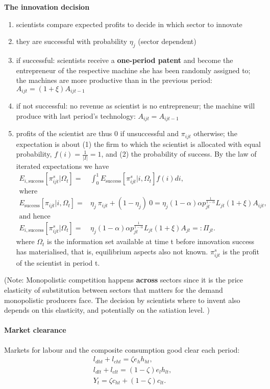  \textbf{The innovation decision}
 \begin{enumerate}
 	\item scientists compare expected profits to decide in which sector to innovate
 	\item they are successful with probability $\eta_j$ (sector dependent)
 	\item if successful: scientists receive a \textbf{one-period patent} and become the entrepreneur of the respective machine she has been randomly assigned to; the machines are more productive than in the previous period: $A_{ijt}=(1+\xi)A_{ijt-1}$
 	\item if not successful: no revenue as scientist is no entrepreneur; the machine will produce with last period's  technology: $A_{ijt}=A_{ijt-1}$
 	\item profits of the scientist are thus 0 if unsuccessful and $\pi_{ijt}$ otherwise; the expectation is about (1) the firm to which the scientist is allocated with equal probability, $f(i)=\frac{1}{|I|}=1$, and (2) the probability of success. By the law of iterated expectations we have
 	\begin{align*}
 	E_{i,\text{success}}[\pi^s_{ijt}| \Omega_t]=& \int_{0}^{1}E_\text{success}[\pi^s_{ijt}|i, \Omega_t]f(i)di,\\ \text{where}&\\
 	E_\text{success}[\pi_{ijt}|i, \Omega_t]=& \eta_j\  \pi_{ijt}+(1-\eta_j)\ 0=\eta_j (1-\alpha)\alpha p_{jt}^\frac{1}{1-\alpha}L_{jt}(1+\xi)A_{ijt},\\
 	\text{and hence}&\\
 	E_{i,\text{success}}[\pi^s_{ijt}| \Omega_t]=&\eta_j (1-\alpha)\alpha p_{jt}^\frac{1}{1-\alpha}L_{jt}(1+\xi)A_{jt}=: \Pi_{jt}.
 	\end{align*}
 	where $\Omega_t$ is the information set available at time t before innovation success has materialised, that is, equilibrium aspects also not known. $\pi^s_{ijt}$ is the profit of the scientist in period t. 
 	
 \end{enumerate}
 (Note: Monopolistic competition happens \textbf{across} sectors since it is the price elasticity of substitution between sectors that matters for the demand monopolistic producers face.
 The decision by scientists where to invent also depends on this elasticity, and potentially on the satiation level. 
 )
 
\paragraph{Market clearance}
Markets for labour and the composite consumption good clear each period:
\begin{align}
l_{dht}+l_{cht}=\zeta e_h h_{ht},\\
l_{dlt}+l_{clt}=(1-\zeta) e_l h_{lt},\\
Y_t=\zeta c_{ht}+(1-\zeta)c_{lt}.
\end{align}

